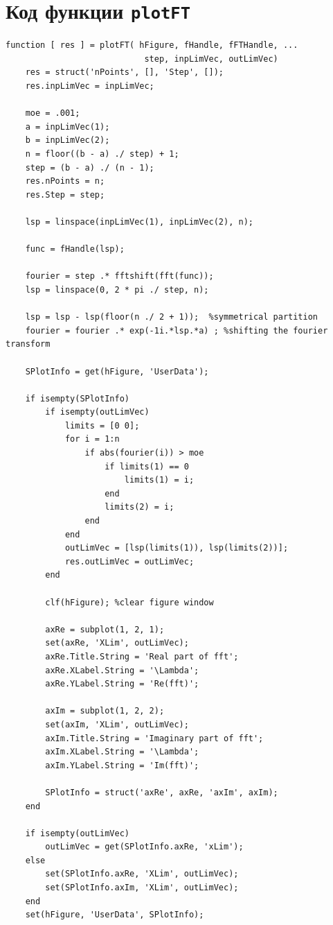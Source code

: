 \documentclass[11pt, oneside, final]{article}
\numberwithin{equation}{section}
\begin{document}
    \section{Код функции \texttt{plotFT}} %
    \label{lst:code}
    \begin{verbatim}
function [ res ] = plotFT( hFigure, fHandle, fFTHandle, ...
                            step, inpLimVec, outLimVec)
    res = struct('nPoints', [], 'Step', []);
    res.inpLimVec = inpLimVec;

    moe = .001;
    a = inpLimVec(1);
    b = inpLimVec(2);
    n = floor((b - a) ./ step) + 1;
    step = (b - a) ./ (n - 1);
    res.nPoints = n;
    res.Step = step;

    lsp = linspace(inpLimVec(1), inpLimVec(2), n);

    func = fHandle(lsp);

    fourier = step .* fftshift(fft(func));
    lsp = linspace(0, 2 * pi ./ step, n);

    lsp = lsp - lsp(floor(n ./ 2 + 1));  %symmetrical partition
    fourier = fourier .* exp(-1i.*lsp.*a) ; %shifting the fourier transform

    SPlotInfo = get(hFigure, 'UserData');

    if isempty(SPlotInfo)
        if isempty(outLimVec)
            limits = [0 0];
            for i = 1:n
                if abs(fourier(i)) > moe
                    if limits(1) == 0
                        limits(1) = i;
                    end
                    limits(2) = i;
                end
            end
            outLimVec = [lsp(limits(1)), lsp(limits(2))];
            res.outLimVec = outLimVec;
        end
    
        clf(hFigure); %clear figure window
    
        axRe = subplot(1, 2, 1);
        set(axRe, 'XLim', outLimVec);
        axRe.Title.String = 'Real part of fft';
        axRe.XLabel.String = '\Lambda';
        axRe.YLabel.String = 'Re(fft)';
    
        axIm = subplot(1, 2, 2);
        set(axIm, 'XLim', outLimVec);
        axIm.Title.String = 'Imaginary part of fft';
        axIm.XLabel.String = '\Lambda';
        axIm.YLabel.String = 'Im(fft)';
   
        SPlotInfo = struct('axRe', axRe, 'axIm', axIm);
    end

    if isempty(outLimVec)
        outLimVec = get(SPlotInfo.axRe, 'xLim');
    else
        set(SPlotInfo.axRe, 'XLim', outLimVec);
        set(SPlotInfo.axIm, 'XLim', outLimVec);
    end
    set(hFigure, 'UserData', SPlotInfo);


\end{verbatim}
\end{document}
